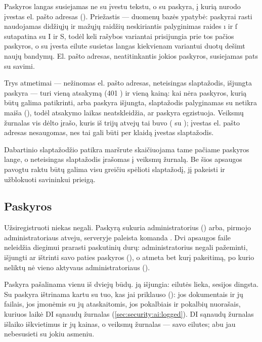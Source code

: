 Paskyros langas susiejamas ne su įvestu tekstu, o su paskyra, į kurią nurodo įvestas el. pašto
adresas (). Priežastis --- duomenų bazės
ypatybė: paskyrai rasti naudojamas didžiųjų ir mažųjų raidžių neskiriantis palyginimas raides
ı ir ſ sutapatina su I ir S, todėl keli rašybos variantai prisijungia prie tos pačios
paskyros, o su įvesta eilute susietas langas kiekvienam variantui duotų dešimt naujų bandymų.
El. pašto adresas, neatitinkantis jokios paskyros, susiejamas pats su savimi.

Trys atmetimai --- nežinomas el. pašto adresas, neteisingas slaptažodis, išjungta paskyra ---
turi vieną atsakymą (401 ) ir vieną kainą: kai nėra paskyros, kurią
būtų galima patikrinti, arba paskyra išjungta, slaptažodis palyginamas su netikra maiša
(), todėl atsakymo laikas neatskleidžia, ar paskyra egzistuoja.
Veiksmų žurnalas vis dėlto įrašo, kuris iš trijų atvejų tai buvo ( su
); įvestas el. pašto adresas nesaugomas, nes tai gali būti per klaidą įvestas
slaptažodis.

Dabartinio slaptažodžio patikra maršrute 
skaičiuojama tame pačiame paskyros lange, o neteisingas slaptažodis įrašomas į veiksmų
žurnalą. Be šios apsaugos pavogtu raktu būtų galima visu greičiu spėlioti slaptažodį, jį pakeisti ir
užblokuoti savininkui prieigą.

\subsection{Paskyros}

Užsiregistruoti niekas negali. Paskyrą sukuria administratorius
() arba, pirmojo administratoriaus atveju, serveryje paleista komanda
. Dvi apsaugos faile  neleidžia diegimui
prarasti paskutinių durų: administratorius negali pažeminti, išjungti ar ištrinti savo paties
paskyros (), o  atmeta bet kurį pakeitimą,
po kurio neliktų nė vieno aktyvaus administratoriaus ().

Paskyra pašalinama vienu iš dviejų būdų.  ją išjungia: eilutės
lieka, sesijos dingsta. Su  paskyra ištrinama kartu su tuo, kas jai priklauso
(): jos dokumentais ir jų failais, jos įmonėmis su jų ataskaitomis, jos
pokalbiais ir pokalbių nuorašais, kuriuos laikė DI sąnaudų žurnalas
(\cref{sec:security:ai:logged}). DI sąnaudų žurnalas išlaiko iškvietimus ir jų kainas, o
veiksmų žurnalas --- savo eilutes; abu jau nebesusieti su jokiu asmeniu.


